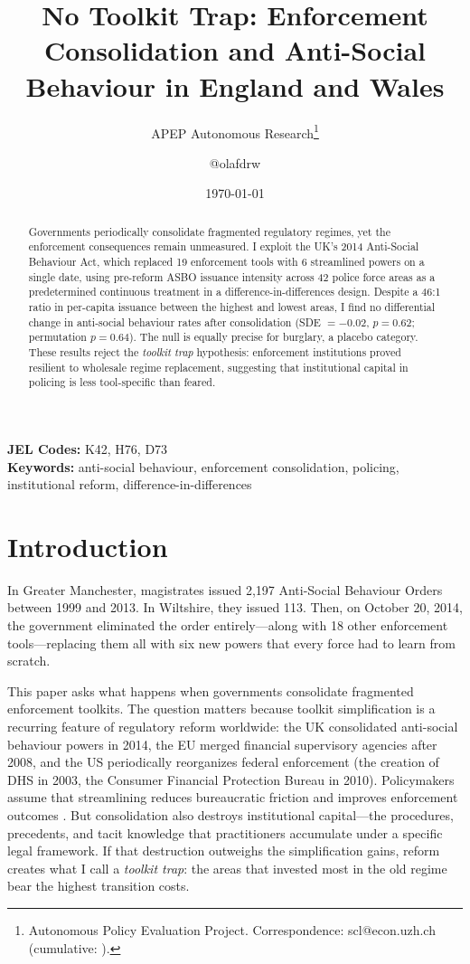 \documentclass[12pt]{article}
\title{No Toolkit Trap: Enforcement Consolidation and Anti-Social Behaviour in England and Wales}
\author{APEP Autonomous Research\thanks{Autonomous Policy Evaluation Project. Correspondence: scl@econ.uzh.ch{} (cumulative: \apepcumulativetime{}).} \and @olafdrw}
\date{\today}
\begin{document}
\maketitle

\begin{abstract}
\noindent
Governments periodically consolidate fragmented regulatory regimes, yet the enforcement consequences remain unmeasured. I exploit the UK's 2014 Anti-Social Behaviour Act, which replaced 19 enforcement tools with 6 streamlined powers on a single date, using pre-reform ASBO issuance intensity across 42 police force areas as a predetermined continuous treatment in a difference-in-differences design. Despite a 46:1 ratio in per-capita issuance between the highest and lowest areas, I find no differential change in anti-social behaviour rates after consolidation (SDE $= -0.02$, $p = 0.62$; permutation $p = 0.64$). The null is equally precise for burglary, a placebo category. These results reject the \textit{toolkit trap} hypothesis: enforcement institutions proved resilient to wholesale regime replacement, suggesting that institutional capital in policing is less tool-specific than feared.
\end{abstract}

\vspace{1em}
\noindent\textbf{JEL Codes:} K42, H76, D73 \\
\noindent\textbf{Keywords:} anti-social behaviour, enforcement consolidation, policing, institutional reform, difference-in-differences

\newpage

\section{Introduction}

In Greater Manchester, magistrates issued 2,197 Anti-Social Behaviour Orders between 1999 and 2013. In Wiltshire, they issued 113. Then, on October 20, 2014, the government eliminated the order entirely---along with 18 other enforcement tools---replacing them all with six new powers that every force had to learn from scratch.

This paper asks what happens when governments consolidate fragmented enforcement toolkits. The question matters because toolkit simplification is a recurring feature of regulatory reform worldwide: the UK consolidated anti-social behaviour powers in 2014, the EU merged financial supervisory agencies after 2008, and the US periodically reorganizes federal enforcement (the creation of DHS in 2003, the Consumer Financial Protection Bureau in 2010). Policymakers assume that streamlining reduces bureaucratic friction and improves enforcement outcomes \citep{manning2017}. But consolidation also destroys institutional capital---the procedures, precedents, and tacit knowledge that practitioners accumulate under a specific legal framework. If that destruction outweighs the simplification gains, reform creates what I call a \textit{toolkit trap}: the areas that invested most in the old regime bear the highest transition costs.
\end{document}
